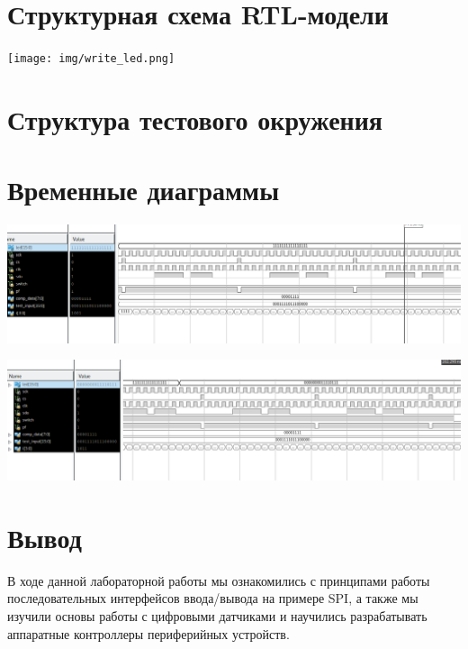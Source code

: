 



\section{Структурная схема RTL-модели}
\begin{centering}

\texttt{[image: img/write\_led.png]}
\end{centering}

\section{Структура тестового окружения}


\section{Временные диаграммы}
\begin{centering}
\includegraphics[width=\textwidth]{img/graph1.png}

\includegraphics[width=\textwidth]{img/graph2.png}
\end{centering}
\section{Вывод}
В ходе данной лабораторной работы мы ознакомились с принципами работы последовательных
интерфейсов ввода/вывода на примере SPI, а также мы изучили основы работы с
цифровыми датчиками и научились разрабатывать аппаратные контроллеры периферийных
устройств.

